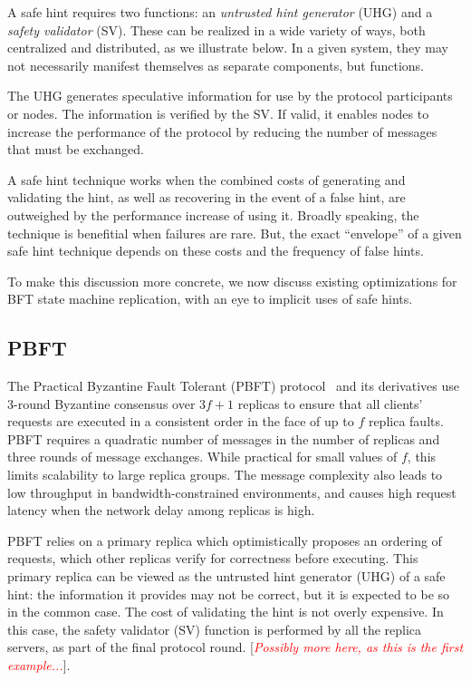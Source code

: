 \documentclass[twocolumn,10pt]{article}
\newcommand{\note}[1]{[\textcolor{red}{\textit{#1}}]}
\begin{document}
A safe hint requires two functions: an \emph{untrusted hint generator}
(UHG) and a \emph{safety validator} (SV).  These can be realized in a
wide variety of ways, both centralized and distributed, as we
illustrate below. In a given system, they may not necessarily manifest
themselves as separate components, but functions.

The UHG generates speculative information for use by the protocol
participants or nodes.  The information is verified by the SV.  If
valid, it enables nodes to increase the performance of the protocol
by reducing the number of messages that must be exchanged.

A safe hint technique works when the combined costs of generating and
validating the hint, as well as recovering in the event of a false
hint, are outweighed by the performance increase of using it.  Broadly
speaking, the technique is benefitial when failures are rare. But, the
exact ``envelope'' of a given safe hint technique depends on these
costs and the frequency of false hints.

To make this discussion more concrete, we now discuss existing
optimizations for BFT state machine replication, with an eye to
implicit uses of safe hints.

\subsection{PBFT}

The Practical Byzantine Fault Tolerant (PBFT)
protocol~\cite{Castro1999} and its derivatives use 3-round Byzantine
consensus over $3f+1$ replicas to ensure that all clients' requests
are executed in a consistent order in the face of up to $f$ replica
faults.  PBFT requires a quadratic number of messages in the number of
replicas and three rounds of message exchanges.  While practical for
small values of $f$, this limits scalability to large replica groups.
The message complexity also leads to low throughput in
bandwidth-constrained environments, and causes high request latency
when the network delay among replicas is high.

PBFT relies on a primary replica which optimistically proposes an
ordering of requests, which other replicas verify for correctness
before executing.  This primary replica can be viewed as the untrusted
hint generator (UHG) of a safe hint: the information it provides may
not be correct, but it is expected to be so in the common case. The
cost of validating the hint is not overly expensive.  In this case,
the safety validator (SV) function is performed by all the replica
servers, as part of the final protocol round.  \note{Possibly more
here, as this is the first example...}.
\end{document}
